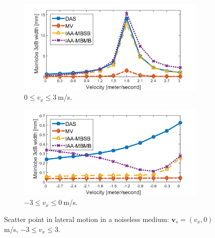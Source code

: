 \begin{figure}[ht]
    \centering
    \begin{subfigure}[t]{\linewidth}
        \includegraphics[width=\linewidth]{./images/results/2.1/speeds_ext_pos.png}
        \caption{$0 \leq v_x \leq 3~$m/s.}
	    \label{fig:width_vs_velocity_ext_pos}
    \end{subfigure}
    \quad
    \begin{subfigure}[t]{\linewidth}
        \includegraphics[width=\linewidth]{./images/results/2.1/speeds_ext_neg.png}
        \caption{$-3 \leq v_x \leq 0~$m/s.}
	    \label{fig:width_vs_velocity_ext_neg}
    \end{subfigure}
	\caption{Scatter point in lateral motion in a noiseless medium: $\boldsymbol{v}_s = (v_x, 0)~$m/s, $-3 \leq v_x \leq 3$.}
	\label{fig:width_vs_velocity_ext}
\end{figure}

